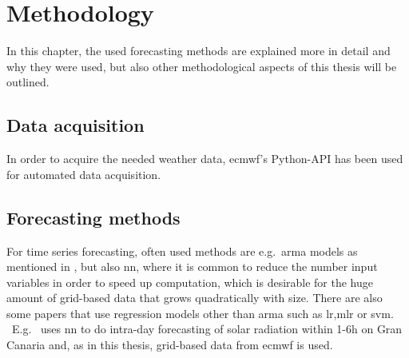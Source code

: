 \chapter{Methodology}
\label{ch:methods}

In this chapter, the used forecasting methods are explained more in detail and why they were used, but also other methodological aspects of this thesis will be outlined.\\


\section{Data acquisition}
\label{sec:dataq}

In order to acquire the needed weather data, \gls{ecmwf}'s Python-API has been used for automated data acquisition.\\

\section{Forecasting methods}
\label{sec:forecastmet}

For time series forecasting, often used methods are e.g.\ \gls{arma} models as mentioned in , but  also \gls{nn}, where it is common to reduce the number input variables in order to speed up computation, which is desirable for the huge amount of grid-based data that grows quadratically with size. There are also some papers that use regression models other than \gls{arma} such as \gls{lr},\gls{mlr} or \gls{svm}.\\\
E.g.\  uses \gls{nn} to do intra-day forecasting of solar radiation within 1-6h on Gran Canaria and, as in this thesis, grid-based data from \gls{ecmwf} is used.\\

